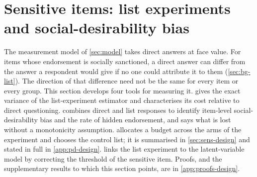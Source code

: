 \section{Sensitive items: list experiments and social-desirability bias}\label{sec:sensitive}

\providecommand{\armT}{\mathsf{T}}
\providecommand{\armC}{\mathsf{C}}
\providecommand{\armD}{\mathsf{D}}
\providecommand{\SDB}{\mathrm{SDB}}
\providecommand{\ECV}{\mathrm{ECV}}
\providecommand{\armL}{\mathsf{L}}

The measurement model of \cref{sec:model} takes direct answers at face value. For items whose endorsement is socially sanctioned, a direct answer can differ from the answer a respondent would give if no one could attribute it to them (\cref{sec:bg-list}). The direction of that difference need not be the same for every item or every group. This section develops four tools for measuring it.  gives the exact variance of the list-experiment estimator and characterises its cost relative to direct questioning.  combines direct and list responses to identify item-level social-desirability bias and the rate of hidden endorsement, and says what is lost without a monotonicity assumption.  allocates a budget across the arms of the experiment and chooses the control list; it is summarised in \cref{sec:sens-design} and stated in full in \cref{app:pd-design}.  links the list experiment to the latent-variable model by correcting the threshold of the sensitive item. Proofs, and the supplementary results to which this section points, are in \cref{app:proofs-design}.

